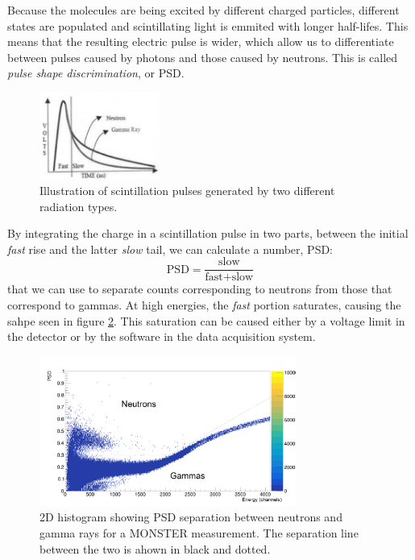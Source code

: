 \documentclass[a4paper,12pt]{report}
\begin{document}
Because the molecules are being excited by different charged particles, different states are populated and scintillating light is emmited with longer half-lifes.
This means that the resulting electric pulse is wider, which allow us to differentiate between pulses caused by photons and those caused by neutrons.
This is called \textit{pulse shape discrimination}, or PSD.

\begin{figure}[H]
	\centering
	\includegraphics[width=0.35\textwidth]{psd_explanation.png}
	\caption{Illustration of scintillation pulses generated by two different radiation types.}	%
	\label{psd_explanation}
\end{figure}

By integrating the charge in a scintillation pulse in two parts, between the initial \textit{fast} rise and the latter \textit{slow} tail, we can calculate a number, PSD:
\begin{equation}
	\text{PSD} = \frac{\text{slow}}{\text{fast}+\text{slow}}	%
\end{equation}
that we can use to separate counts corresponding to neutrons from those that correspond to gammas.
At high energies, the \textit{fast} portion saturates, causing the sahpe seen in figure \ref{example_psd}.
This saturation can be caused either by a voltage limit in the detector or by the software in the data acquisition system.

\begin{figure}[H]
	\centering
	\includegraphics[width=0.75\textwidth]{example_psd.png}
	\caption{2D histogram showing PSD separation between neutrons and gamma rays for a MONSTER measurement.
	The separation line between the two is ahown in black and dotted.}
	\label{example_psd}
\end{figure}
\end{document}
